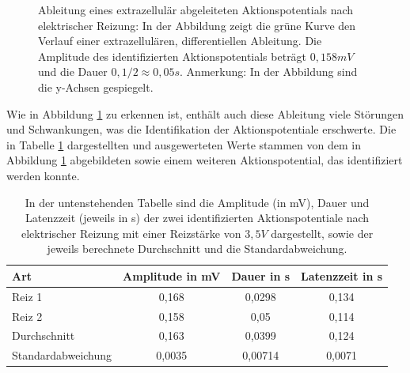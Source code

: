 \documentclass[11pt]{article}
\begin{document}
\begin{figure}[H]
\caption{Ableitung eines extrazellulär abgeleiteten Aktionspotentials nach elektrischer Reizung: In der Abbildung zeigt die grüne Kurve den Verlauf einer extrazellulären, differentiellen Ableitung.  Die Amplitude des identifizierten Aktionspotentials beträgt $0,158 mV$ und die Dauer $0,1/2 \approx 0,05 s$. Anmerkung: In der Abbildung sind die y-Achsen gespiegelt.}
\label{g2}
\end{figure}

Wie in Abbildung \ref{g2} zu erkennen ist, enthält auch diese Ableitung viele Störungen und Schwankungen, was die Identifikation der Aktionspotentiale erschwerte. Die in Tabelle \ref{werte2} dargestellten und ausgewerteten Werte stammen von dem in Abbildung \ref{g2} abgebildeten sowie einem weiteren Aktionspotential, das identifiziert werden konnte.

\begin{table}[H]
\caption{In der untenstehenden Tabelle sind die Amplitude (in mV), Dauer und Latenzzeit (jeweils in s) der zwei identifizierten Aktionspotentiale nach elektrischer Reizung mit einer Reizstärke von $3,5V$ dargestellt, sowie der jeweils berechnete Durchschnitt und die Standardabweichung.}
\begin{center}
\begin{tabular}{l||c|c|c}
Art & Amplitude in mV & Dauer in s & Latenzzeit in s\\
\hline\hline
 Reiz 1& 0,168 & 0,0298 & 0,134\\
Reiz 2& 0,158 & 0,05 & 0,114\\
\hline
Durchschnitt & 0,163 & 0,0399 & 0,124\\
Standardabweichung & 0,0035 &0,00714 & 0,0071
\end{tabular}
\end{center}
\label{werte2}
\end{table}
\end{document}
